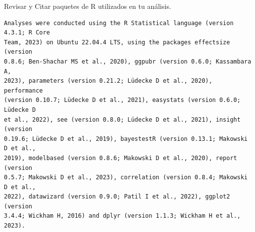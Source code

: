 \documentclass[
  10pt]{article}
\begin{document}
\begin{tcolorbox}[enhanced jigsaw, colframe=quarto-callout-color-frame, arc=.35mm, rightrule=.15mm, colback=white, bottomrule=.15mm, toprule=.15mm, leftrule=.75mm, left=2mm, breakable, opacityback=0]

Revisar y Citar paquetes de R utilizados en tu análisis.

\begin{verbatim}
Analyses were conducted using the R Statistical language (version 4.3.1; R Core
Team, 2023) on Ubuntu 22.04.4 LTS, using the packages effectsize (version
0.8.6; Ben-Shachar MS et al., 2020), ggpubr (version 0.6.0; Kassambara A,
2023), parameters (version 0.21.2; Lüdecke D et al., 2020), performance
(version 0.10.7; Lüdecke D et al., 2021), easystats (version 0.6.0; Lüdecke D
et al., 2022), see (version 0.8.0; Lüdecke D et al., 2021), insight (version
0.19.6; Lüdecke D et al., 2019), bayestestR (version 0.13.1; Makowski D et al.,
2019), modelbased (version 0.8.6; Makowski D et al., 2020), report (version
0.5.7; Makowski D et al., 2023), correlation (version 0.8.4; Makowski D et al.,
2022), datawizard (version 0.9.0; Patil I et al., 2022), ggplot2 (version
3.4.4; Wickham H, 2016) and dplyr (version 1.1.3; Wickham H et al., 2023).


\end{verbatim}
\end{tcolorbox}
\end{document}
